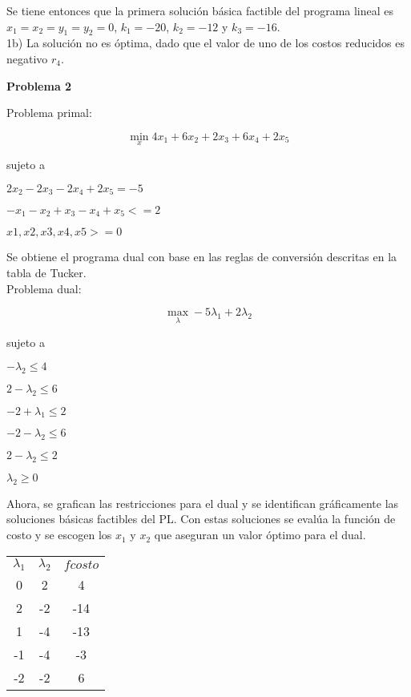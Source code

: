 \documentclass[10pt]{article}
\begin{document}
Se tiene entonces que la primera soluci\'on b\'asica factible del programa lineal es $x_1=x_2=y_1=y_2=0$, $k_1=-20$, $k_2=-12$ y $k_3=-16$. \\

1b) La soluci\'on no es \'optima, dado que el valor de uno de los costos reducidos es negativo $r_4$.

\bigskip
{\bf \Large{Problema 2}}
\medskip


Problema primal:

\begin{center}
\[\min_{x}  4x_1+6x_2+2x_3+6x_4+2x_5\] 

sujeto a

$2x_2-2x_3-2x_4+2x_5 = -5$

$-x_1-x_2+x_3-x_4+x_5 <= 2$

$x1, x2, x3, x4, x5 >= 0$

\end{center}

Se obtiene el programa dual con base en las reglas de conversión descritas en la tabla de Tucker. \\


Problema dual:
\begin{center}
\[\max_{\lambda} -5\lambda_1+2\lambda_2 \] 

sujeto a

$-\lambda_2 \leq 4$

$2-\lambda_2\leq6$

$-2+\lambda_1\leq2$

$-2-\lambda_2\leq6$

$2-\lambda_2\leq2$

$\lambda_2\geq0$

\end{center}


Ahora, se grafican las restricciones para el dual y se identifican gr\'aficamente las soluciones básicas factibles del PL. Con estas soluciones se eval\'ua la funci\'on de costo y se escogen los $x_1$ y $x_2$ que aseguran un valor \'optimo para el dual.
\bigskip

\begin{center}
\begin{tabular}{c c c}
{\bf$\lambda_1$}	& {\bf$\lambda_2$} &{\bf$fcosto$} \\
0&	2&	4\\
2&	-2&	-14\\
1&	-4&	-13\\
-1&	-4&	-3\\
-2&	-2&	6\\
\end{tabular}
\end{center}
\end{document}
